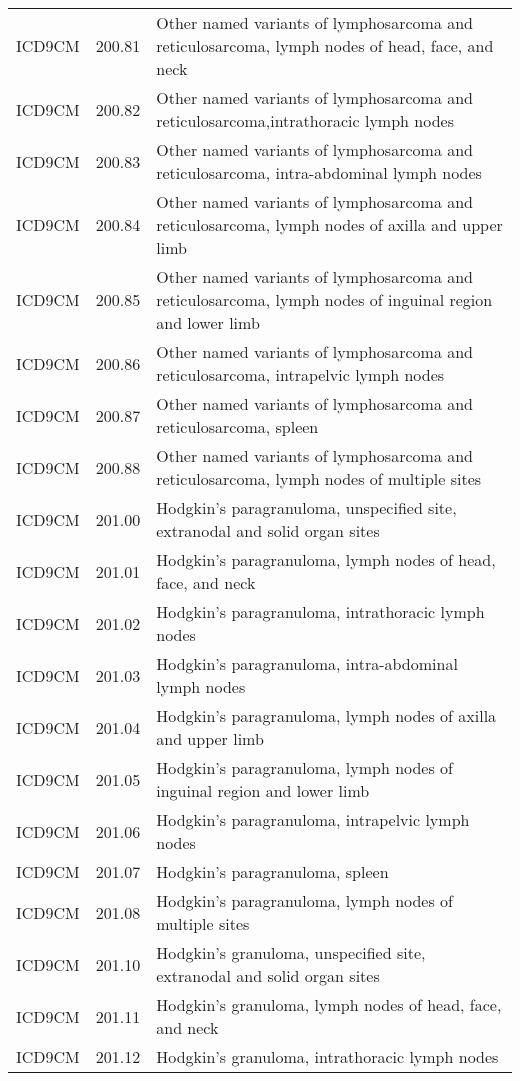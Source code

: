 \begin{longtable}{p{}p{}p{}}
  ICD9CM & 200.81 & Other named variants of lymphosarcoma and reticulosarcoma, lymph nodes of head, face, and neck \\ 
  ICD9CM & 200.82 & Other named variants of lymphosarcoma and reticulosarcoma,intrathoracic lymph nodes \\ 
  ICD9CM & 200.83 & Other named variants of lymphosarcoma and reticulosarcoma, intra-abdominal lymph nodes \\ 
  ICD9CM & 200.84 & Other named variants of lymphosarcoma and reticulosarcoma, lymph nodes of axilla and upper limb \\ 
  ICD9CM & 200.85 & Other named variants of lymphosarcoma and reticulosarcoma, lymph nodes of inguinal region and lower limb \\ 
  ICD9CM & 200.86 & Other named variants of lymphosarcoma and reticulosarcoma, intrapelvic lymph nodes \\ 
  ICD9CM & 200.87 & Other named variants of lymphosarcoma and reticulosarcoma, spleen \\ 
  ICD9CM & 200.88 & Other named variants of lymphosarcoma and reticulosarcoma, lymph nodes of multiple sites \\ 
  ICD9CM & 201.00 & Hodgkin's paragranuloma, unspecified site, extranodal and solid organ sites \\ 
  ICD9CM & 201.01 & Hodgkin's paragranuloma, lymph nodes of head, face, and neck \\ 
  ICD9CM & 201.02 & Hodgkin's paragranuloma, intrathoracic lymph nodes \\ 
  ICD9CM & 201.03 & Hodgkin's paragranuloma, intra-abdominal lymph nodes \\ 
  ICD9CM & 201.04 & Hodgkin's paragranuloma, lymph nodes of axilla and upper limb \\ 
  ICD9CM & 201.05 & Hodgkin's paragranuloma, lymph nodes of inguinal region and lower limb \\ 
  ICD9CM & 201.06 & Hodgkin's paragranuloma, intrapelvic lymph nodes \\ 
  ICD9CM & 201.07 & Hodgkin's paragranuloma, spleen \\ 
  ICD9CM & 201.08 & Hodgkin's paragranuloma, lymph nodes of multiple sites \\ 
  ICD9CM & 201.10 & Hodgkin's granuloma, unspecified site, extranodal and solid organ sites \\ 
  ICD9CM & 201.11 & Hodgkin's granuloma, lymph nodes of head, face, and neck \\ 
  ICD9CM & 201.12 & Hodgkin's granuloma, intrathoracic lymph nodes \\ 

\end{longtable}
